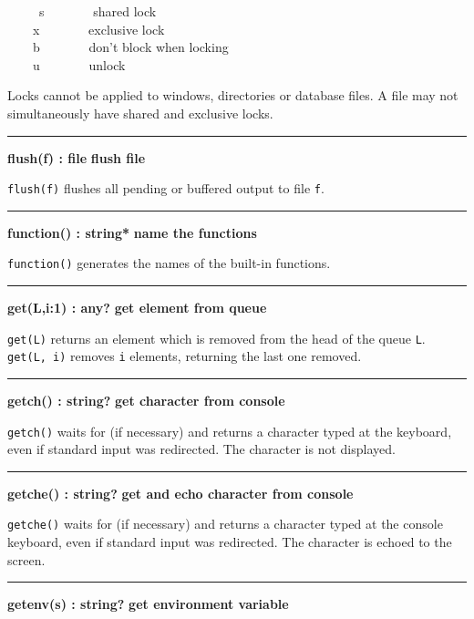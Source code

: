 \ \ \ \ \ s \ \ \ \ \ \ \ shared lock\\
 \ \ \ \ x \ \ \ \ \ \ \ exclusive lock\\
 \ \ \ \ b \ \ \ \ \ \ \ don't block when
locking\\
 \ \ \ \ u \ \ \ \ \ \ \ unlock 

Locks cannot be applied to windows, directories or database files. A
file may not simultaneously have shared and exclusive locks.

\bigskip\hrule\vspace{0.1cm}
\noindent
{\bf flush(f) : file } \hfill {\bf flush file}

\noindent
{}\texttt{flush(f)} flushes all pending or buffered output
to file \texttt{f}.

\bigskip\hrule\vspace{0.1cm}
\noindent
{\bf function() : string* } \hfill {\bf name the functions}

\noindent
\texttt{function()} generates the names of the built-in functions.

\bigskip\hrule\vspace{0.1cm}
\noindent
{\bf get(L,i:1) : any? } \hfill {\bf get element from queue}\WarningNotThreadSafe

\noindent
\texttt{get(L)} returns an element which is removed from the head of the
queue \texttt{L}. \texttt{get(L, i)} removes \texttt{i}
elements, returning the last one removed.

\bigskip\hrule\vspace{0.1cm}
\noindent
{\bf getch() : string? } \hfill {\bf get character from console}

\noindent
\texttt{getch()} waits for (if necessary) and returns a character typed
at the keyboard, even if standard input was redirected.
The character is not displayed.

\bigskip\hrule\vspace{0.1cm}
\noindent
{\bf getche() : string? } \hfill {\bf get and echo character from console}

\noindent
\texttt{getche()} waits for (if necessary) and returns a character typed
at the console keyboard, even if standard input was redirected. The
character is echoed to the screen.

\bigskip\hrule\vspace{0.1cm}
\noindent
{\bf getenv(s) : string? } \hfill {\bf get environment variable}

